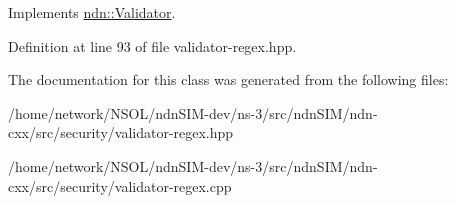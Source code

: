 Implements \hyperlink{classndn_1_1Validator_a8ad5a76c67c489afcb493f722f142e34}{ndn\+::\+Validator}.



Definition at line 93 of file validator-\/regex.\+hpp.



The documentation for this class was generated from the following files\+:\begin{DoxyCompactItemize}
\item 
/home/network/\+N\+S\+O\+L/ndn\+S\+I\+M-\/dev/ns-\/3/src/ndn\+S\+I\+M/ndn-\/cxx/src/security/validator-\/regex.\+hpp\item 
/home/network/\+N\+S\+O\+L/ndn\+S\+I\+M-\/dev/ns-\/3/src/ndn\+S\+I\+M/ndn-\/cxx/src/security/validator-\/regex.\+cpp\end{DoxyCompactItemize}
